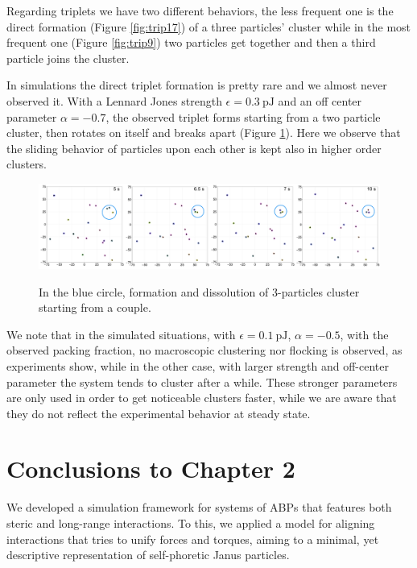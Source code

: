 \documentclass[../../master_thesis_np.tex]{subfiles}
\begin{document}
	Regarding triplets we have two different behaviors, the less frequent one is the direct formation (Figure \ref{fig:trip17}) of a three particles' cluster while in the most frequent one (Figure \ref{fig:trip9}) two particles get together and then a third particle joins the cluster.
	
	In simulations the direct triplet formation is pretty rare and we almost never observed it.
	With a Lennard Jones strength $\epsilon = \SI{0.3}{\pico\joule}$ and an off center parameter $\alpha = -0.7$, the observed triplet forms starting from a two particle cluster, then rotates on itself and breaks apart (Figure \ref{fig:simtrip}).
	Here we observe that the sliding behavior of particles upon each other is kept also in higher order clusters.
	
	\begin{figure}[hbtp]
		\centering
		\includegraphics[width = \textwidth]{qual/simtrip.png}
		\label{fig:simtrip}
		\caption{In the blue circle, formation and dissolution of 3-particles cluster starting from a couple.}
	\end{figure}

	We note that in the simulated situations, with $\epsilon = \SI{0.1}{\pico\joule}$, $\alpha = -0.5$, with the observed packing fraction, no macroscopic clustering nor flocking is observed, as experiments show, while in the other case, with larger strength and off-center parameter the system tends to cluster after a while.
	These stronger parameters are only used in order to get noticeable clusters faster, while we are aware that they do not reflect the experimental behavior at steady state.
	
	\section{Conclusions to Chapter 2}
	We developed a simulation framework for systems of ABPs that features both steric and long-range interactions.
	To this, we applied a model for aligning interactions that tries to unify forces and torques, aiming to a minimal, yet descriptive representation of self-phoretic Janus particles.
	
\end{document}
